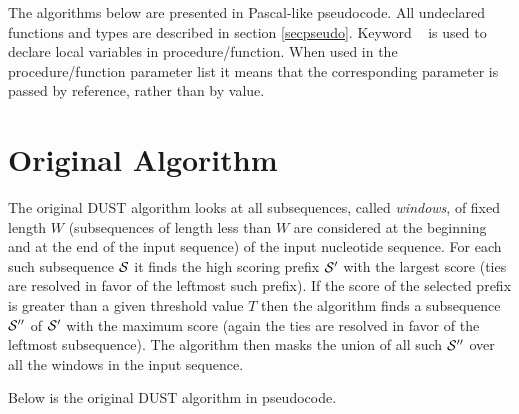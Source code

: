 \documentclass{article}
\newcommand{\cals}{{\cal S}}
\newcommand{\VARP}{\keyword{var}\ }
\begin{document}
The algorithms below are presented in Pascal-like pseudocode. All undeclared
functions and types are described in section \ref{secpseudo}. Keyword \VARP
is used to declare local variables in procedure/function. When used in
the procedure/function parameter list it means that the corresponding parameter
is passed by reference, rather than by value.

\section{Original Algorithm}

The original DUST algorithm looks at all subsequences, called {\em windows},
of fixed length $W$ (subsequences of length less than $W$ are considered at 
the beginning and at the end of the input sequence) of the input nucleotide 
sequence.  For each such subsequence $\cals$ it finds the high scoring prefix 
$\cals'$ with the largest score (ties are resolved in favor of the leftmost
such prefix). If the score of the selected prefix is greater than a given
threshold value $T$ then the algorithm finds a subsequence $\cals''$ of $\cals'$ 
with the maximum score (again the ties are resolved in favor of the leftmost 
subsequence). The algorithm then masks the union of all such $\cals''$ over 
all the windows in the input sequence.

Below is the original DUST algorithm in pseudocode.
\end{document}
